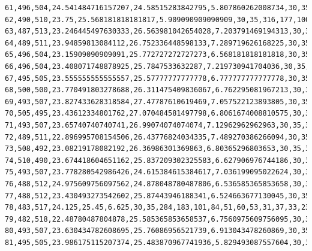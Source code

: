 \documentclass[authoryearcitations]{UoYCSproject}
\begin{document}
\begin{landscape}
\begin{verbatim}
61,496,504,24.541484716157207,24.58515283842795,5.807860262008734,30,35,315,194,94,57,71,45,58,32,33,37,23,18,11,3,6,1,0,2,0
62,490,510,23.75,25.568181818181817,5.909090909090909,30,35,316,177,100,65,59,68,39,56,25,32,23,18,10,6,2,3,0,1,0
63,487,513,23.246445497630333,26.563981042654028,7.203791469194313,30,35,295,196,101,66,57,57,51,43,43,27,21,15,16,8,1,2,0,1,0
64,489,511,23.94859813084112,26.752336448598133,7.289719626168225,30,35,290,197,107,72,51,57,46,45,43,33,19,15,10,10,4,0,1,0,0
65,496,504,23.15909090909091,25.772727272727273,6.568181818181818,30,35,300,187,104,72,62,44,52,41,42,35,25,12,14,2,8,0,0,0,0
66,496,504,23.408071748878925,25.7847533632287,7.219730941704036,30,35,308,182,105,63,66,52,39,53,29,35,32,14,10,6,2,4,0,0,0
67,495,505,23.555555555555557,25.57777777777778,6.777777777777778,30,35,314,180,102,69,54,65,47,37,46,15,31,22,9,4,2,2,1,0,0
68,500,500,23.770491803278688,26.311475409836067,6.762295081967213,30,35,345,166,95,63,50,59,50,43,30,44,13,23,11,5,0,2,1,0,0
69,493,507,23.827433628318584,27.47787610619469,7.057522123893805,30,35,322,201,89,63,54,51,47,44,35,25,28,14,21,3,2,1,0,0,0
70,505,495,23.43612334801762,27.070484581497798,6.8061674008810575,30,35,327,183,99,54,51,61,42,40,43,28,22,23,12,14,1,0,0,0,0
71,493,507,23.65740740740741,26.99074074074074,7.12962962962963,30,35,309,191,103,62,47,49,54,41,33,39,20,22,12,8,10,0,0,0,0
72,489,511,22.896995708154506,26.43776824034335,7.489270386266094,30,35,328,173,102,69,56,46,43,45,31,32,29,13,21,3,9,0,0,0,0
73,508,492,23.08219178082192,26.36986301369863,6.80365296803653,30,35,311,195,94,60,67,46,44,39,43,24,27,14,15,16,4,1,0,0,0
74,510,490,23.674418604651162,25.837209302325583,6.627906976744186,30,35,300,191,111,62,61,57,43,32,37,36,16,25,10,13,3,3,0,0,0
75,493,507,23.778280542986426,24.615384615384617,7.036199095022624,30,35,309,178,104,76,54,55,47,36,37,30,24,15,16,11,6,2,0,0,0
76,488,512,24.975609756097562,24.878048780487806,6.536585365853658,30,35,289,191,98,69,69,41,57,41,35,34,26,19,6,10,12,3,0,0,0
77,488,512,23.430493273542602,25.87443946188341,6.524663677130045,30,35,310,167,110,58,63,61,35,49,38,32,21,24,11,5,9,6,1,0,0
78,483,517,24.125,25.45,6.625,30,35,284,183,101,84,51,60,53,31,37,33,23,19,24,5,8,2,2,0,0
79,482,518,22.48780487804878,25.585365853658537,6.7560975609756095,30,35,281,183,99,74,66,53,53,45,29,40,23,19,15,13,3,2,2,0,0
80,493,507,23.630434782608695,25.76086956521739,6.913043478260869,30,35,313,175,81,70,63,68,44,43,40,24,29,11,16,15,6,1,1,0,0
81,495,505,23.986175115207374,25.483870967741936,5.829493087557604,30,35,309,177,87,67,69,58,57,35,40,30,23,19,8,11,7,2,1,0,0

\end{verbatim}
\end{landscape}
\end{document}
